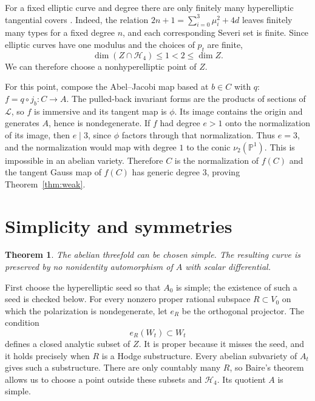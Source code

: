 \documentclass{amsart}
\newtheorem{theorem}{Theorem}
\begin{document}
For a fixed elliptic curve and degree there are only finitely many
hyperelliptic tangential covers
\cite[Proposition~2.5, 3.; Section~2, Remark~1, 3.--4.]{treibich2025}.
Indeed, the relation $2n+1=\sum_{i=0}^3\mu_i^2+4d$ leaves finitely many
types for a fixed degree $n$, and each corresponding Severi set is
finite. Since elliptic curves have one modulus and the choices of
$p_t$ are finite,
\[
\dim\left(Z\cap\mathcal{H}_4\right)\leqslant1<2\leqslant\dim Z.
\]
We can therefore choose a nonhyperelliptic point of $Z$.

For this point, compose the Abel--Jacobi map based at $b\in C$ with $q$:
$f=q\circ j_b:C\longrightarrow A$. The pulled-back invariant forms
are the products of sections of $\mathcal{L}$, so $f$ is immersive and
its tangent map is $\phi$. Its image contains the origin and generates
$A$, hence is nondegenerate. If $f$ had degree $e>1$ onto the
normalization of its image, then $e\mid3$, since $\phi$ factors through
that normalization. Thus $e=3$, and the normalization would map with
degree $1$ to the conic $\nu_2(\mathbb{P}^1)$. This is impossible in an
abelian variety. Therefore $C$ is the normalization of $f(C)$ and the
tangent Gauss map of $f(C)$ has generic degree $3$, proving
Theorem~\ref{thm:weak}.

\section{Simplicity and symmetries}

\begin{theorem}\label{thm:strong}
The abelian threefold can be chosen simple. The resulting curve is
preserved by no nonidentity automorphism of $A$ with scalar differential.
\end{theorem}

First choose the hyperelliptic seed so that $A_0$ is simple; the existence
of such a seed is checked below. For every nonzero proper rational
subspace $R\subset V_0$ on which the polarization is nondegenerate, let
$e_R$ be the orthogonal projector. The condition
\[
e_R(W_t)\subset W_t
\]
defines a closed analytic subset of $Z$. It is proper because it misses
the seed, and it holds precisely when $R$ is a Hodge substructure.
Every abelian subvariety of $A_t$ gives such a substructure. There are
only countably many $R$, so Baire's theorem allows us to choose a point
outside these subsets and $\mathcal{H}_4$. Its quotient $A$ is simple.
\end{document}
